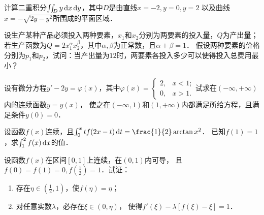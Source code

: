 \documentclass[plain,noanswer,medmath]{../../template/jnuexam}
\begin{document}

\begin{problem}
计算二重积分$\iint_D y\mathop{}\!\mathrm{d} x\mathop{}\!\mathrm{d} y$，其中$D$是由直线$x = - 2, y = 0, y = 2$
以及曲线$x = - \sqrt{2y - y^2}$所围成的平面区域．
\end{problem}



\begin{problem}
设生产某种产品必须投入两种要素，$x_1$和$x_2$分别为两要素的投入量，$Q$为产出量；
若生产函数为$Q = 2x_1^{\alpha}x_2^{\beta}$，其中$\alpha , \beta$为正常数，且$\alpha + \beta = 1$．
假设两种要素的价格分别为$p_1$和$p_2$，试问：当产出量为$12$时，两要素各投入多少可以使得投入总费用最小？
\end{problem}



\begin{problem}
设有微分方程$y' - 2y = \varphi(x)$，其中$\varphi (x) = \begin{cases}
  2, & x < 1; \\
  0, & x > 1.
\end{cases}$试求在$\left(-\infty , +\infty \right)$内的连续函数$y = y(x)$，
使之在$\left(-\infty ,1 \right)$和$\left(1, +\infty \right)$内都满足所给方程，且满足条件$y(0) = 0$．
\end{problem}



\begin{problem}
设函数$f(x)$连续，且$\int_0^x tf(2x - t)\dt = \frac{1}{2}\arctan x^2$．
已知$f(1) = 1$，求$\int_1^2 f(x)\mathop{}\!\mathrm{d} x$的值．
\end{problem}



\begin{problem}
设函数$f(x)$在区间$\left[0,1 \right]$上连续，在$\left(0,1 \right)$内可导，
且$f(0) = f(1) = 0, f\left(\frac{1}{2} \right) = 1$．试证：
\begin{enumerate}
\item 存在$\eta \in \left(\frac{1}{2},1 \right)$，使$f\left(\eta \right) = \eta$；
\item 对任意实数$\lambda$，必存在$\xi \in \left(0,\eta \right)$，
      使得$f'\left(\xi \right) - \lambda \left[f\left(\xi \right) - \xi \right] = 1$．
\end{enumerate}
\end{problem}


\end{document}
